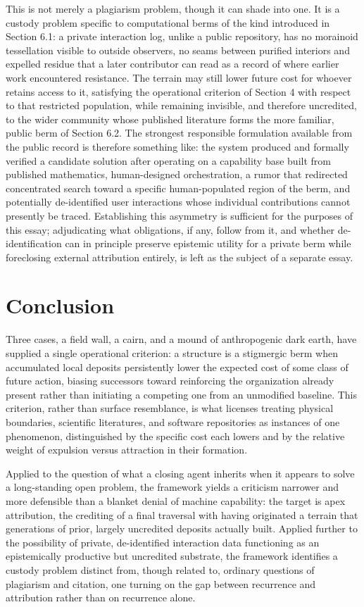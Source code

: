 \documentclass[11pt]{article}
\begin{document}
This is not merely a plagiarism problem, though it can shade into one. It is a custody problem specific to computational berms of the kind introduced in Section 6.1: a private interaction log, unlike a public repository, has no morainoid tessellation visible to outside observers, no seams between purified interiors and expelled residue that a later contributor can read as a record of where earlier work encountered resistance. The terrain may still lower future cost for whoever retains access to it, satisfying the operational criterion of Section 4 with respect to that restricted population, while remaining invisible, and therefore uncredited, to the wider community whose published literature forms the more familiar, public berm of Section 6.2. The strongest responsible formulation available from the public record is therefore something like: the system produced and formally verified a candidate solution after operating on a capability base built from published mathematics, human-designed orchestration, a rumor that redirected concentrated search toward a specific human-populated region of the berm, and potentially de-identified user interactions whose individual contributions cannot presently be traced. Establishing this asymmetry is sufficient for the purposes of this essay; adjudicating what obligations, if any, follow from it, and whether de-identification can in principle preserve epistemic utility for a private berm while foreclosing external attribution entirely, is left as the subject of a separate essay.

\section{Conclusion}

Three cases, a field wall, a cairn, and a mound of anthropogenic dark earth, have supplied a single operational criterion: a structure is a stigmergic berm when accumulated local deposits persistently lower the expected cost of some class of future action, biasing successors toward reinforcing the organization already present rather than initiating a competing one from an unmodified baseline. This criterion, rather than surface resemblance, is what licenses treating physical boundaries, scientific literatures, and software repositories as instances of one phenomenon, distinguished by the specific cost each lowers and by the relative weight of expulsion versus attraction in their formation.

Applied to the question of what a closing agent inherits when it appears to solve a long-standing open problem, the framework yields a criticism narrower and more defensible than a blanket denial of machine capability: the target is apex attribution, the crediting of a final traversal with having originated a terrain that generations of prior, largely uncredited deposits actually built. Applied further to the possibility of private, de-identified interaction data functioning as an epistemically productive but uncredited substrate, the framework identifies a custody problem distinct from, though related to, ordinary questions of plagiarism and citation, one turning on the gap between recurrence and attribution rather than on recurrence alone.
\end{document}

